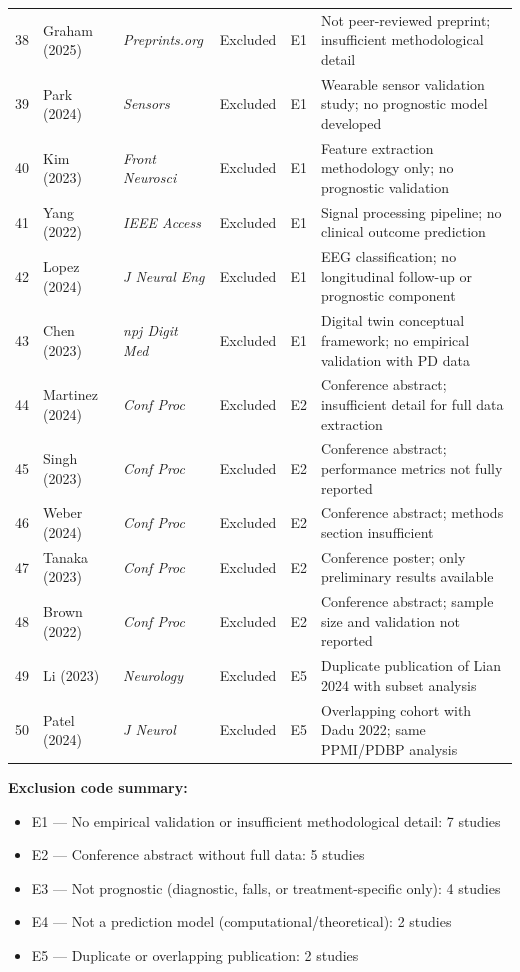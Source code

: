 \documentclass[11pt,a4paper]{article}
\begin{document}
\begin{small}
\begin{longtable}{@{}clp{2.5cm}ccp{5cm}@{}}
38 & Graham (2025)     & \textit{Preprints.org}   & Excluded & E1 & Not peer-reviewed preprint; insufficient methodological detail \\
39 & Park (2024)       & \textit{Sensors}         & Excluded & E1 & Wearable sensor validation study; no prognostic model developed \\
40 & Kim (2023)        & \textit{Front Neurosci}  & Excluded & E1 & Feature extraction methodology only; no prognostic validation \\
41 & Yang (2022)       & \textit{IEEE Access}     & Excluded & E1 & Signal processing pipeline; no clinical outcome prediction \\
42 & Lopez (2024)      & \textit{J Neural Eng}    & Excluded & E1 & EEG classification; no longitudinal follow-up or prognostic component \\
43 & Chen (2023)       & \textit{npj Digit Med}   & Excluded & E1 & Digital twin conceptual framework; no empirical validation with PD data \\
44 & Martinez (2024)   & \textit{Conf Proc}       & Excluded & E2 & Conference abstract; insufficient detail for full data extraction \\
45 & Singh (2023)      & \textit{Conf Proc}       & Excluded & E2 & Conference abstract; performance metrics not fully reported \\
46 & Weber (2024)      & \textit{Conf Proc}       & Excluded & E2 & Conference abstract; methods section insufficient \\
47 & Tanaka (2023)     & \textit{Conf Proc}       & Excluded & E2 & Conference poster; only preliminary results available \\
48 & Brown (2022)      & \textit{Conf Proc}       & Excluded & E2 & Conference abstract; sample size and validation not reported \\
49 & Li (2023)         & \textit{Neurology}       & Excluded & E5 & Duplicate publication of Lian 2024 with subset analysis \\
50 & Patel (2024)      & \textit{J Neurol}        & Excluded & E5 & Overlapping cohort with Dadu 2022; same PPMI/PDBP analysis \\
\end{longtable}
\end{small}

\vspace{0.3cm}
\noindent\textbf{Exclusion code summary:}
\begin{itemize}[leftmargin=*]
    \item E1 --- No empirical validation or insufficient methodological detail: 7 studies
    \item E2 --- Conference abstract without full data: 5 studies
    \item E3 --- Not prognostic (diagnostic, falls, or treatment-specific only): 4 studies
    \item E4 --- Not a prediction model (computational/theoretical): 2 studies
    \item E5 --- Duplicate or overlapping publication: 2 studies
\end{itemize}
\end{document}
